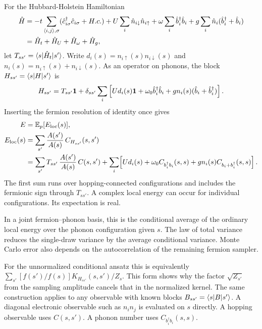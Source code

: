 \documentclass[../../main.tex]{subfiles}
\begin{document}
For the Hubbard-Holstein Hamiltonian
\begin{align}
  \hat H &= -t \sum_{\langle i,j \rangle, \sigma} (\hat c_{i \sigma}^\dagger \hat c_{i \sigma} + H.c.) + U \sum_i \hat n_{i\downarrow}\hat n_{i \uparrow} + \omega \sum_i \hat b_i^\dagger \hat b_i + g \sum_i \hat n_i (\hat b_i^\dagger + \hat b_i)  \label{eq:hubbard_holstein_hamiltonian} \\
  &= \hat H_t + \hat H_U + \hat H_\omega + \hat H_g, \notag
\end{align} 
let \(T_{ss'}=\langle s\rvert \hat H_t\lvert s'\rangle\). Write \(d_i(s)=n_{i\uparrow}(s)n_{i\downarrow}(s)\) and
\(n_i(s)=n_{i\uparrow}(s)+n_{i\downarrow}(s)\). As an operator on phonons,
the block \(H_{ss'}=\langle s\rvert H\lvert s'\rangle\) is
\begin{equation}
 H_{ss'}=T_{ss'}\mathbf{1}+\delta_{ss'}
 \sum_i\left[U d_i(s)\mathbf{1}+\omega_0 \hat b_i^\dagger \hat b_i+
               g n_i(s)(\hat b_i+\hat b_i^\dagger)\right].
 \label{eq:H-block}
\end{equation}
Inserting the fermion resolution of identity once gives
\begin{align}
 E &= \mathbb{E}_p[E_{\mathrm{loc}}(s)], \\
 E_{\mathrm{loc}}(s)
   &=\sum_{s'} \frac{A(s')}{A(s)}\, C_{H_{ss'}}(s,s') \notag\\
   &= \sum_{s'} T_{ss'}\,\frac{A(s')}{A(s)}\, C(s,s')
      + \sum_i\!\left[
        U d_i(s)+\omega_0 C_{b_i^\dagger b_i}(s,s)
        +g n_i(s) C_{b_i+b_i^\dagger}(s,s)\right].
 \label{eq:energy}
\end{align}
The first sum runs over hopping-connected configurations and includes
the fermionic sign through \(T_{ss'}\). A complex local energy can occur
for individual configurations. Its expectation is real.

In a joint fermion--phonon basis, this is the conditional average of
the ordinary local energy over the phonon configuration given \(s\).
The law of total variance reduces the single-draw variance by the
average conditional variance. Monte Carlo error also depends on
the autocorrelation of the remaining fermion sampler.

For the unnormalized conditional ansatz this is equivalently
\(\sum_{s'}[f(s')/f(s)]K_{H_{ss'}}(s,s')/Z_s\).
This form shows why the factor \(\sqrt{Z_{s'}}\) from the sampling
amplitude cancels that in the normalized kernel. The same construction
applies to any observable with known blocks \(B_{ss'}=\langle s\rvert B\lvert s'\rangle\).
A diagonal electronic observable such as \(n_i n_j\) is evaluated on
\(s\) directly. A hopping observable uses \(C(s,s')\). A phonon number
uses \(C_{b_i^\dagger b_i}(s,s)\).
\end{document}
